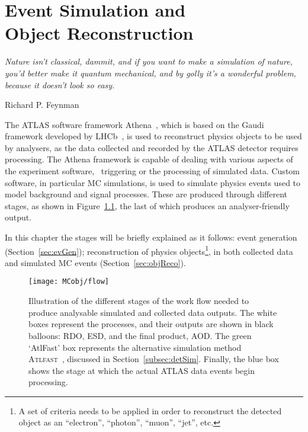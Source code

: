 \chapter[Event Simulation and Object Reconstruction]{Event Simulation and \protect\\Object Reconstruction}
\label{ch:evSimObjReco}
\epigraph{\emph{Nature isn't classical, dammit, and if you want to make a simulation of nature, you'd better make it quantum mechanical, and by golly it's a wonderful problem, because it doesn't look so easy.}} {Richard P. Feynman}

	The \ac{ATLAS} software framework Athena~\cite{TDR2005}, which is based on the Gaudi~\cite{Gaudi2000} framework developed by \ac{LHCb}~\cite{LHCb2008}, is used to reconstruct physics objects to be used by analysers, as the data collected and recorded by the \ac{ATLAS} detector requires processing. The Athena framework is capable of dealing with various aspects of the experiment software, \eg\ triggering or the processing of simulated data. Custom software, in particular \ac{MC} simulations, is used to simulate physics events used to model background and signal processes. These are produced through different stages, as shown in Figure~\ref{fig:workflow}, the last of which produces an analyser-friendly output. 

	In this chapter the stages will be briefly explained as it follows: event generation (Section~\ref{sec:evGen}); reconstruction of physics objects\footnote{A set of criteria needs to be applied in order to reconstruct the detected object as an ``electron'', ``photon'', ``muon'', ``jet'', etc.}, in both collected data and simulated \ac{MC} events (Section~\ref{sec:objReco}).%

	\begin{figure}
		\centering
		\texttt{[image: MCobj/flow]}
		\caption{\label{fig:workflow} Illustration of the different stages of the work flow needed to produce analysable simulated and collected data outputs. The white boxes represent the processes, and their outputs are shown in black balloons: \ac{RDO}, \ac{ESD}, and the final product, \ac{AOD}. The green `AtlFast' box represents the alternative simulation method \textsc{Atlfast}~\cite{Lukas2012}, discussed in Section~\ref{subsec:detSim}. Finally, the blue box shows the stage at which the actual \ac{ATLAS} data events begin processing.}
	\end{figure}



